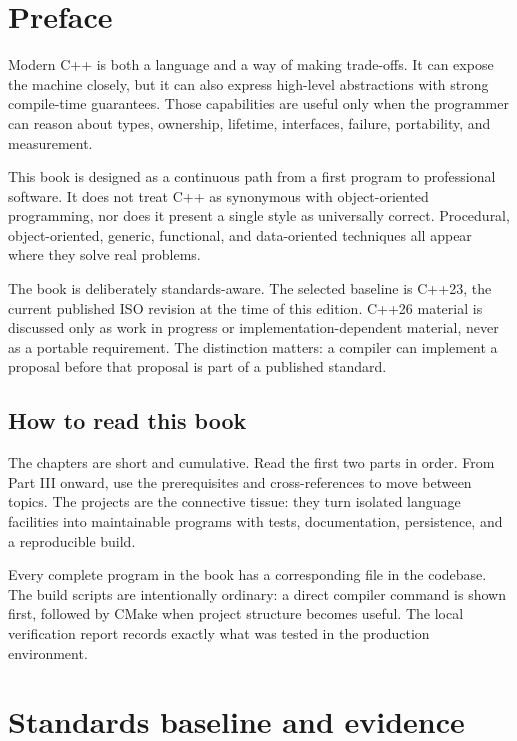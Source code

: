 {\hypersetup{pageanchor=false}\bookcover}

\chapter*{Preface}

Modern C++ is both a language and a way of making trade-offs. It can expose the machine closely, but it can also express high-level abstractions with strong compile-time guarantees. Those capabilities are useful only when the programmer can reason about types, ownership, lifetime, interfaces, failure, portability, and measurement.

This book is designed as a continuous path from a first program to professional software. It does not treat C++ as synonymous with object-oriented programming, nor does it present a single style as universally correct. Procedural, object-oriented, generic, functional, and data-oriented techniques all appear where they solve real problems.

The book is deliberately standards-aware. The selected baseline is C++23, the current published ISO revision at the time of this edition. C++26 material is discussed only as work in progress or implementation-dependent material, never as a portable requirement. The distinction matters: a compiler can implement a proposal before that proposal is part of a published standard.

\section*{How to read this book}
The chapters are short and cumulative. Read the first two parts in order. From Part III onward, use the prerequisites and cross-references to move between topics. The projects are the connective tissue: they turn isolated language facilities into maintainable programs with tests, documentation, persistence, and a reproducible build.

Every complete program in the book has a corresponding file in the codebase. The build scripts are intentionally ordinary: a direct compiler command is shown first, followed by CMake when project structure becomes useful. The local verification report records exactly what was tested in the production environment.

\chapter*{Standards baseline and evidence}

